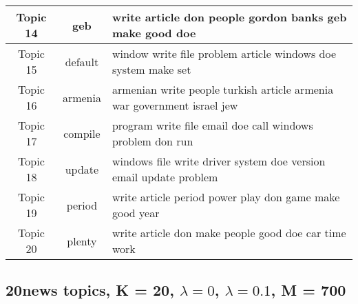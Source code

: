 \documentclass{article}
\begin{document}
\begin{table}[h]
\begin{center}
\begin{tabular}{|c|c|l|}
Topic	14	&	geb & write article don people gordon banks geb make good doe	\\ \hline
Topic	15	&	default & window write file problem article windows doe system make set	\\ \hline
Topic	16	&	armenia & armenian write people turkish article armenia war government israel jew	\\ \hline
Topic	17	&	compile & program write file email doe call windows problem don run	\\ \hline
Topic	18	&	update & windows file write driver system doe version email update problem	\\ \hline
Topic	19	&	period & write article period power play don game make good year	\\ \hline
Topic	20	&	plenty & write article don make people good doe car time work	\\ \hline

          \end{tabular}

       \label{tab:M100 topics}
   \end{center}
\vspace{-10pt}
\end{table}

\newpage

\subsection{20news topics, K = 20, $\lambda=0$, $\lambda=0.1$, M = 700}
\label{appendix:K20-M700}
\end{document}
